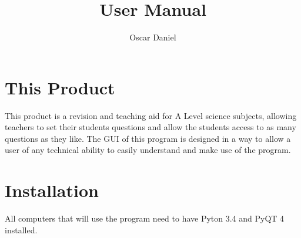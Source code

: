 \documentclass{book}
\title{User Manual}
\author{Oscar Daniel}
\date{ }
\begin{document}
 
\maketitle
 
\tableofcontents
 
\chapter{This Product}
 This product is a revision and teaching aid for A Level science subjects, allowing teachers to set their students questions and allow the students access to as many questions as they like. The GUI of this program is designed in a way to allow a user of any technical ability to easily understand and make use of the program.
 


 
\chapter{Installation}
 All computers that will use the program need to have Pyton 3.4 and PyQT 4 installed.

 
\end{document}
